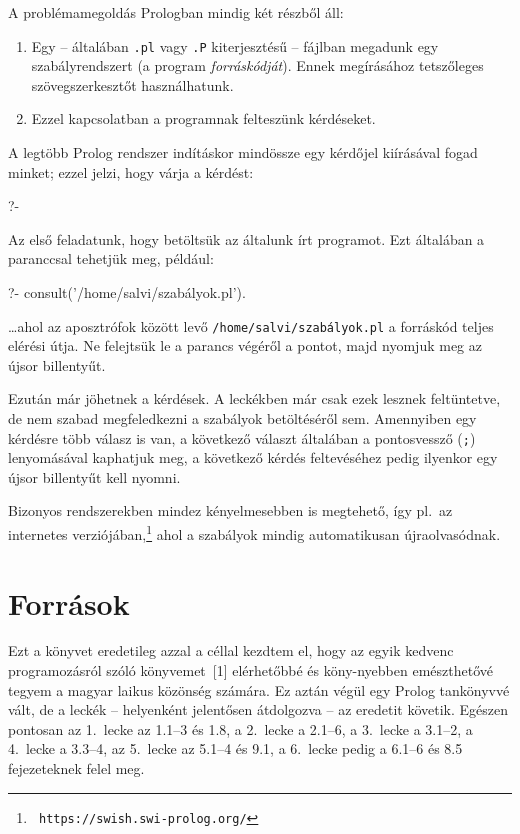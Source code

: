 A problémamegoldás Prologban mindig két részből áll:
\begin{enumerate}
\item Egy -- általában {\tt .pl} vagy {\tt .P} kiterjesztésű --
  fájlban megadunk egy szabályrendszert (a program
  \emph{forráskódját}). Ennek megírásához tetszőleges
  szövegszerkesztőt használhatunk.
\item Ezzel kapcsolatban a programnak felteszünk kérdéseket.
\end{enumerate}
A legtöbb Prolog rendszer indításkor mindössze egy kérdőjel kiírásával
fogad minket; ezzel jelzi, hogy várja a kérdést:
\begin{query}
?-
\end{query}  
Az első feladatunk, hogy betöltsük az általunk írt programot. Ezt
általában a  paranccsal tehetjük meg, például:
\begin{query}
?- consult('/home/salvi/szabályok.pl').
\end{query}
\dots ahol az aposztrófok között levő {\tt /home/salvi/szabályok.pl} a
forráskód teljes elérési útja. Ne felejtsük le a parancs végéről a
pontot, majd nyomjuk meg az újsor billentyűt.

Ezután már jöhetnek a kérdések. A leckékben már csak ezek lesznek
feltüntetve, de nem szabad megfeledkezni a szabályok betöltéséről sem.
Amennyiben egy kérdésre több válasz is van, a következő választ
általában a pontosvessző ({\tt ;}) lenyomásával kaphatjuk meg, a
következő kérdés feltevéséhez pedig ilyenkor egy újsor billentyűt kell
nyomni.

Bizonyos rendszerekben mindez kényelmesebben is megtehető, így pl.~az
 internetes  verziójában,\footnote[2]{\tt
https://swish.swi-prolog.org/} ahol a szabályok mindig automatikusan
újraolvasódnak.

\section*{Források}
Ezt a könyvet eredetileg azzal a céllal kezdtem el, hogy az egyik
kedvenc programozásról szóló könyvemet~[1] elérhetőbbé és köny-nyebben
emészthetővé tegyem a magyar laikus közönség számára. Ez aztán végül
egy Prolog tankönyvvé vált, de a leckék -- helyenként jelentősen
átdolgozva -- az eredetit követik. Egészen pontosan az 1.~lecke az
1.1--3 és 1.8, a 2.~lecke a 2.1--6, a 3.~lecke a 3.1--2, a 4.~lecke a
3.3--4, az 5.~lecke az 5.1--4 és 9.1, a 6.~lecke pedig a 6.1--6 és 8.5
fejezeteknek felel meg.

